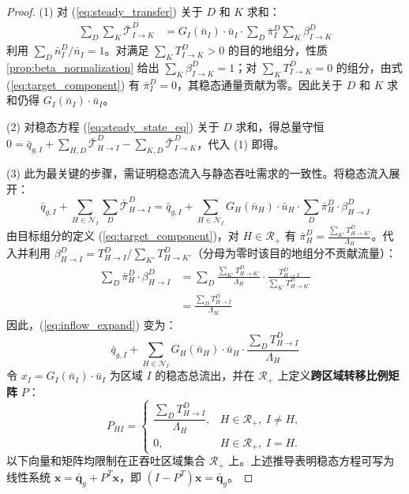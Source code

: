 \documentclass[a4paper,12pt]{article}
\theoremstyle{plain}
\theoremstyle{definition}
\theoremstyle{remark}
\begin{document}
\begin{proof}
(1) 对 (\ref{eq:steady_transfer}) 关于 $D$ 和 $K$ 求和：
\begin{equation}
\begin{aligned}
    \sum_{D} \sum_{K} \bar{\mathcal{T}}_{I \to K}^D &= G_I(\bar{n}_I) \cdot \bar{u}_I \cdot \sum_{D} \bar\pi_I^D \sum_{K} \beta_{I \to K}^D
\end{aligned}
\end{equation}
利用 $\sum_D \bar{n}_I^D / \bar{n}_I = 1$。对满足 $\sum_K T_{I\to K}^D>0$ 的目的地组分，性质 \ref{prop:beta_normalization} 给出 $\sum_K \beta_{I \to K}^D = 1$；对 $\sum_K T_{I\to K}^D=0$ 的组分，由式 (\ref{eq:target_component}) 有 $\bar\pi_I^D=0$，其稳态通量贡献为零。因此关于 $D$ 和 $K$ 求和仍得 $G_I(\bar{n}_I) \cdot \bar{u}_I$。

(2) 对稳态方程 (\ref{eq:steady_state_eq}) 关于 $D$ 求和，得总量守恒 $0 = \bar{q}_{g,I} + \sum_{H,D} \bar{\mathcal{T}}_{H \to I}^D - \sum_{K,D} \bar{\mathcal{T}}_{I \to K}^D$，代入 (1) 即得。

(3) 此为最关键的步骤，需证明稳态流入与静态吞吐需求的一致性。将稳态流入展开：
\begin{equation}\label{eq:inflow_expand}
    \bar{q}_{g,I} + \sum_{H\in\mathcal N_I} \sum_D \bar{\mathcal{T}}_{H \to I}^D = \bar{q}_{g,I} + \sum_{H\in\mathcal N_I} G_H(\bar{n}_H) \cdot \bar{u}_H \cdot \sum_D \bar\pi_H^D \cdot \beta_{H \to I}^D
\end{equation}
由目标组分的定义 (\ref{eq:target_component})，对 $H\in\mathcal R_+$ 有 $\bar\pi_H^D = \frac{\sum_{K'} T_{H \to K'}^D}{\Lambda_H}$。代入并利用 $\beta_{H \to I}^D = T_{H \to I}^D / \sum_{K'} T_{H \to K'}^D$（分母为零时该目的地组分不贡献流量）：
\begin{equation}
\begin{aligned}
    \sum_D \bar\pi_H^D \cdot \beta_{H \to I}^D
    &= \sum_D \frac{\sum_{K'} T_{H \to K'}^D}{\Lambda_H} \cdot \frac{T_{H \to I}^D}{\sum_{K'} T_{H \to K'}^D} \\
    &= \frac{\sum_D T_{H \to I}^D}{\Lambda_H}
\end{aligned}
\end{equation}
因此，(\ref{eq:inflow_expand}) 变为：
\begin{equation}
    \bar{q}_{g,I} + \sum_{H\in\mathcal N_I} G_H(\bar{n}_H) \cdot \bar{u}_H \cdot \frac{\sum_D T_{H \to I}^D}{\Lambda_H}
\end{equation}
令 $x_I = G_I(\bar{n}_I) \cdot \bar{u}_I$ 为区域 $I$ 的稳态总流出，并在 $\mathcal R_+$ 上定义\textbf{跨区域转移比例矩阵} $P$：
\begin{equation}\label{eq:transfer_matrix}
    P_{HI} =
    \begin{cases}
    \dfrac{\sum_D T_{H \to I}^D}{\Lambda_H}, & H\in\mathcal R_+,\ I\ne H,\\[1.0em]
    0, & H\in\mathcal R_+,\ I=H .
    \end{cases}
\end{equation}
以下向量和矩阵均限制在正吞吐区域集合 $\mathcal R_+$ 上。上述推导表明稳态方程可写为线性系统 $\bm{x} = \bar{\bm{q}}_g + P^T \bm{x}$，即 $(I - P^T)\bm{x} = \bar{\bm{q}}_g$。


\end{proof}
\end{document}
